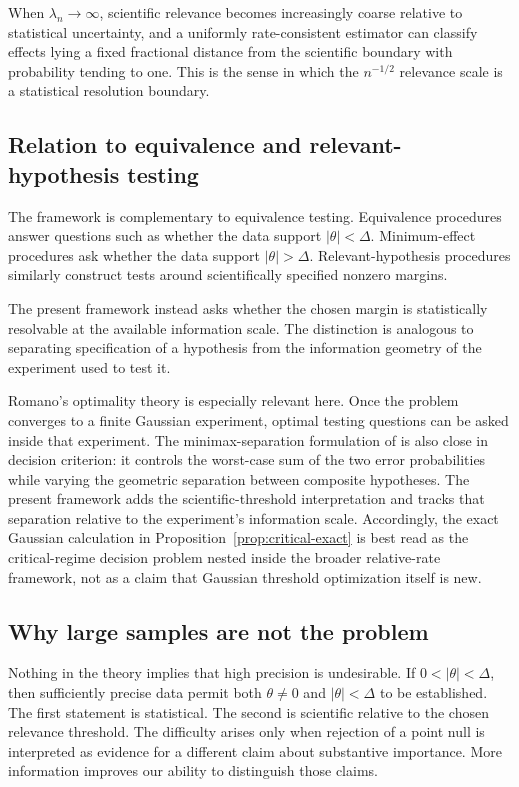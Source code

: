 \documentclass[11pt]{article}
\theoremstyle{remark}
\begin{document}
When $\lambda_n\to\infty$, scientific relevance becomes increasingly coarse relative to statistical uncertainty, and a uniformly rate-consistent estimator can classify effects lying a fixed fractional distance from the scientific boundary with probability tending to one. This is the sense in which the $n^{-1/2}$ relevance scale is a statistical resolution boundary.

\subsection{Relation to equivalence and relevant-hypothesis testing}

The framework is complementary to equivalence testing. Equivalence procedures answer questions such as whether the data support $|\theta|<\Delta$. Minimum-effect procedures ask whether the data support $|\theta|>\Delta$. Relevant-hypothesis procedures similarly construct tests around scientifically specified nonzero margins.

The present framework instead asks whether the chosen margin is statistically resolvable at the available information scale. The distinction is analogous to separating specification of a hypothesis from the information geometry of the experiment used to test it.

Romano's optimality theory is especially relevant here. Once the problem converges to a finite Gaussian experiment, optimal testing questions can be asked inside that experiment. The minimax-separation formulation of \citet{blanchard2018} is also close in decision criterion: it controls the worst-case sum of the two error probabilities while varying the geometric separation between composite hypotheses. The present framework adds the scientific-threshold interpretation and tracks that separation relative to the experiment's information scale. Accordingly, the exact Gaussian calculation in Proposition~\ref{prop:critical-exact} is best read as the critical-regime decision problem nested inside the broader relative-rate framework, not as a claim that Gaussian threshold optimization itself is new.

\subsection{Why large samples are not the problem}

Nothing in the theory implies that high precision is undesirable. If $0<|\theta|<\Delta$, then sufficiently precise data permit both $\theta\ne0$ and $|\theta|<\Delta$ to be established. The first statement is statistical. The second is scientific relative to the chosen relevance threshold. The difficulty arises only when rejection of a point null is interpreted as evidence for a different claim about substantive importance. More information improves our ability to distinguish those claims.
\end{document}
